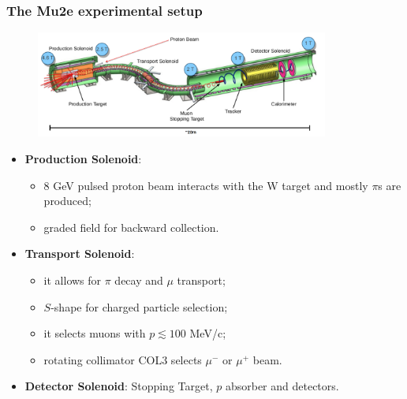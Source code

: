 \documentclass{beamer}
\begin{document}
\begin{frame}
    \frametitle{The Mu2e experimental setup}
    \vspace{-7mm}
     \begin{figure}[h]
            \centering
            \hspace*{-4ex}
            \includegraphics[width=1.1\framewidth, height=3.5cm ]{figures/png/Screenshot_20240913_162936.png}
        \end{figure}
                \setlength{\leftmargini}{-0.5em}
\vspace{-2mm}
        \begin{itemize}
        
            \item \textbf{Production Solenoid}:
            \begin{itemize}
                \item 8 GeV pulsed proton beam interacts with the W target and mostly $\pi$s are produced;
                \item graded field for backward collection.
            \end{itemize}
            \item \textbf{Transport Solenoid}:
            \begin{itemize}
                \item it allows for $\pi$ decay and $\mu$ transport;
                \item $S$-shape for charged particle selection;
                \item it selects muons with $p \lesssim 100 $ MeV/c;
                \item rotating collimator COL3 selects $\mu^-$ or $\mu^+$ beam.
            \end{itemize}
\item \textbf{Detector Solenoid}: Stopping Target, $p$ absorber and detectors.
        \end{itemize}
\end{frame}
\end{document}
